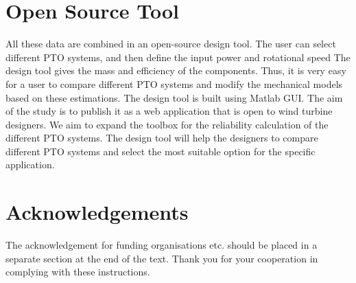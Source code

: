 \documentclass{article}\usepackage{graphicx, color}
\begin{document}
\section{Open Source Tool}
All these data are combined in an open-source design tool. The user can select different PTO systems, and then define the input power and rotational speed The design tool gives the mass and efficiency of the components. Thus, it is very easy for a user to compare different PTO systems and modify the mechanical models based on these estimations. The design tool is built using Matlab GUI. The aim of the study is to publish it as a web application that is open to wind turbine designers. We aim to expand the toolbox for the reliability calculation of the different PTO systems. The design tool will help the designers to compare different PTO systems and select the most suitable option for the specific application.

\section*{Acknowledgements}
The acknowledgement for funding organisations etc.
should be placed in a separate section at the end of the
text. Thank you for your cooperation in complying with
these instructions.


\noindent

\end{document}
